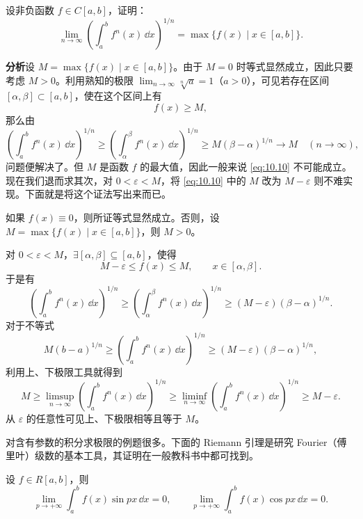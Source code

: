 \begin{xexample}[10.2.5]
设非负函数 $f\in C[a,b]$，证明：
\begin{equation}
  \lim_{n\to\infty}\left(\int_a^b f^n(x)\,\dd x\right)^{1/n}
  =\max\{f(x)\mid x\in[a,b]\}.
  \tag{10.9}
  \label{eq:10.9}
\end{equation}
\end{xexample}
\begin{xsolution}
\textbf{分析}\quad 设 $M=\max\{f(x)\mid x\in[a,b]\}$。由于 $M=0$ 时等式显然成立，因此只要考虑 $M>0$。利用熟知的极限 $\lim_{n\to\infty}\sqrt[n]{a}=1$（$a>0$），可见若存在区间 $[\alpha,\beta]\subset[a,b]$，使在这个区间上有
\begin{equation}
  f(x)\geqslant M,
  \tag{10.10}
  \label{eq:10.10}
\end{equation}
那么由
\[
  \left(\int_a^b f^n(x)\,\dd x\right)^{1/n}
  \geqslant\left(\int_\alpha^\beta f^n(x)\,\dd x\right)^{1/n}
  \geqslant M(\beta-\alpha)^{1/n}\to M\quad(n\to\infty),
\]
问题便解决了。但 $M$ 是函数 $f$ 的最大值，因此一般来说 \eqref{eq:10.10} 不可能成立。现在我们退而求其次，对 $0<\varepsilon<M$，将 \eqref{eq:10.10} 中的 $M$ 改为 $M-\varepsilon$ 则不难实现。下面就是将这个证法写出来而已。

如果 $f(x)\equiv0$，则所证等式显然成立。否则，设 $M=\max\{f(x)\mid x\in[a,b]\}$，则 $M>0$。

对 $0<\varepsilon<M$，$\exists[\alpha,\beta]\subseteq[a,b]$，使得
\[
  M-\varepsilon\leqslant f(x)\leqslant M,
  \qquad x\in[\alpha,\beta].
\]
于是有
\[
  \left(\int_a^b f^n(x)\,\dd x\right)^{1/n}
  \geqslant\left(\int_\alpha^\beta f^n(x)\,\dd x\right)^{1/n}
  \geqslant(M-\varepsilon)(\beta-\alpha)^{1/n}.
\]
对于不等式
\[
  M(b-a)^{1/n}\geqslant\left(\int_a^b f^n(x)\,\dd x\right)^{1/n}
  \geqslant(M-\varepsilon)(\beta-\alpha)^{1/n},
\]
利用上、下极限工具就得到
\[
  M\geqslant\limsup_{n\to\infty}\left(\int_a^b f^n(x)\,\dd x\right)^{1/n}
  \geqslant\liminf_{n\to\infty}\left(\int_a^b f^n(x)\,\dd x\right)^{1/n}
  \geqslant M-\varepsilon.
\]
从 $\varepsilon$ 的任意性可见上、下极限相等且等于 $M$。
\end{xsolution}

对含有参数的积分求极限的例题很多。下面的 Riemann 引理是研究 Fourier（傅里叶）级数的基本工具，其证明在一般教科书中都可找到。

\begin{xexample}[10.2.6（Riemann 引理）]
设 $f\in R[a,b]$，则
\[
  \lim_{p\to+\infty}\int_a^b f(x)\sin px\,\dd x=0,
  \qquad
  \lim_{p\to+\infty}\int_a^b f(x)\cos px\,\dd x=0.
\]
\end{xexample}

